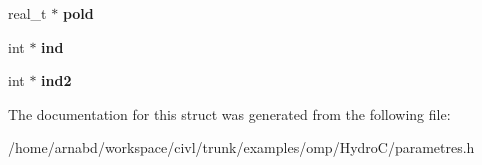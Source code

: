 \begin{DoxyCompactItemize}
\item 
\hypertarget{struct__hydrowork_a1ebc6e6f5afc8fa412a086fba5289d08}{}real\+\_\+t $\ast$ {\bfseries pold}\label{struct__hydrowork_a1ebc6e6f5afc8fa412a086fba5289d08}

\item 
\hypertarget{struct__hydrowork_a94b9d66b2cbf740e16fd4094c9699418}{}int $\ast$ {\bfseries ind}\label{struct__hydrowork_a94b9d66b2cbf740e16fd4094c9699418}

\item 
\hypertarget{struct__hydrowork_a3d4f8dff539042b41f4827cb768d6753}{}int $\ast$ {\bfseries ind2}\label{struct__hydrowork_a3d4f8dff539042b41f4827cb768d6753}

\end{DoxyCompactItemize}


The documentation for this struct was generated from the following file\+:\begin{DoxyCompactItemize}
\item 
/home/arnabd/workspace/civl/trunk/examples/omp/\+Hydro\+C/parametres.\+h\end{DoxyCompactItemize}
